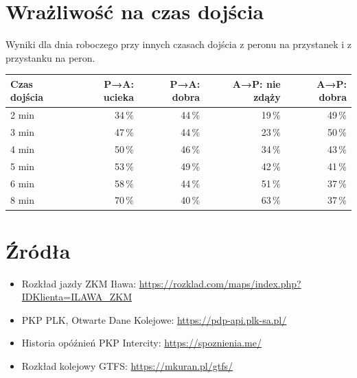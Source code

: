 \documentclass[10pt,a4paper]{article}
\begin{document}
\section{Wrażliwość na czas dojścia}
Wyniki dla dnia roboczego przy innych czasach dojścia z peronu na przystanek i z przystanku na peron.
{\small
\begin{center}\begin{tabular}{@{}l r r r r@{}}\toprule
Czas dojścia & P→A: ucieka & P→A: dobra & A→P: nie zdąży & A→P: dobra \\ \midrule
2 min & 34\,\% & 44\,\% & 19\,\% & 49\,\% \\
3 min & 47\,\% & 44\,\% & 23\,\% & 50\,\% \\
4 min & 50\,\% & 46\,\% & 34\,\% & 43\,\% \\
5 min & 53\,\% & 49\,\% & 42\,\% & 41\,\% \\
6 min & 58\,\% & 44\,\% & 51\,\% & 37\,\% \\
8 min & 70\,\% & 40\,\% & 63\,\% & 37\,\% \\
\bottomrule\end{tabular}\end{center}}
\section*{Źródła}
\begin{itemize}
\item Rozkład jazdy ZKM Iława: \url{https://rozklad.com/maps/index.php?IDKlienta=ILAWA_ZKM}
\item PKP PLK, Otwarte Dane Kolejowe: \url{https://pdp-api.plk-sa.pl/}
\item Historia opóźnień PKP Intercity: \url{https://spoznienia.me/}
\item Rozkład kolejowy GTFS: \url{https://mkuran.pl/gtfs/}
\end{itemize}
\end{document}
